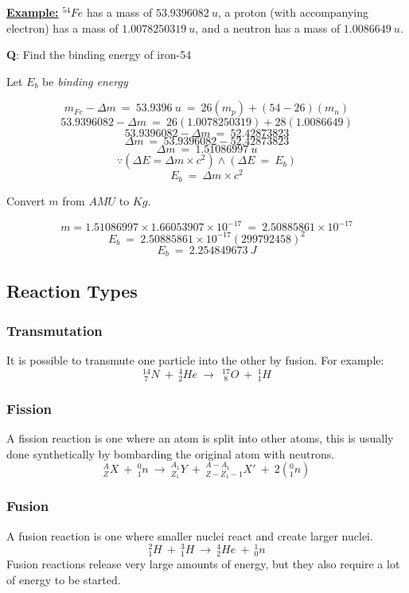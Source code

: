 \documentclass[12pt]{article}
\begin{document}
\begin{boxA}
	\textbf{\underline{Example:}}\bigbreak
	$^{54}Fe$ has a mass of $53.9396082 \ u$, a proton (with accompanying electron)
 has a mass of $1.0078250319 \ u$, and a neutron has a mass of $1.0086649 \ u$. \bigbreak

 \textbf{Q}: Find the binding energy of iron-54 \bigbreak

 Let $E_b$ be \emph{binding energy}

$$m_{Fe} - \Delta m \ = \ 53.9396 \ u \ = \ 26(m_p) + (54-26)(m_n)$$
$$53.9396082 - \Delta m \ = \ 26(1.0078250319) + 28(1.0086649)$$
$$53.9396082 - \Delta m \ = \ 52.42873823$$
$$\Delta m \ = \ 53.9396082 - 52.42873823$$
$$\Delta m \ = \ 1.51086997 \ u$$ \bigbreak
$$\because \left(\Delta E = \Delta m \times c^2 \right) \land \left(\Delta E \ = \ E_b \right)$$
$$E_b \ = \ \Delta m \times c^2$$
\begin{center}
Convert $m$ from $AMU$ to $Kg$. 
\end{center}
$$m = 1.51086997 \times 1.66053907 \times 10^{-17} \ = \ 2.50885861 \times 10^{-17}$$
$$E_b \ = \ 2.50885861 \times 10^{-17}(299 792 458)^2$$
$$E_b \ = \ 2.254849673 \ J$$
\end{boxA}

\newpage

\subsection{Reaction Types}

\subsubsection{Transmutation}

It is possible to transmute one particle into the other by fusion. For example: $$^{14}_{\ 7}N \ + \ ^{4}_{2}He \ \rightarrow \ \ ^{17}_{\ 8}O \ + \ ^{1}_{1}H$$

\subsubsection{Fission}
A fission reaction is one where an atom is split into other atoms, this is usually done synthetically by bombarding the original atom with neutrons. $$^{A}_{Z}X \ + \ ^0_1n \ \rightarrow \ ^{A_1}_{Z_{1}}Y \ + \ ^{A-A_1}_{Z-Z_1-1}X' \ + \ 2\left(^{0}_{1}n \right)$$

\subsubsection{Fusion}
A fusion reaction is one where smaller nuclei react and create larger nuclei.
$$_{1}^2H \ + \ _{1}^3H \ \rightarrow \ ^4_2He \ + \ ^1_0n$$
Fusion reactions release very large amounts of energy, but 
they also require a lot of energy to be started. \bigbreak 
\end{document}
